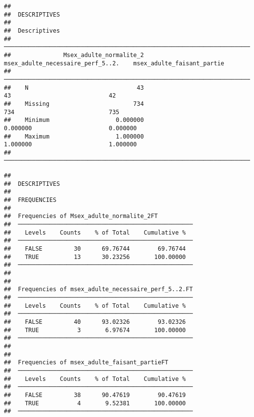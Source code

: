 \documentclass[
]{article}
\begin{document}
\begin{verbatim}
## 
##  DESCRIPTIVES
## 
##  Descriptives                                                                                              
##  ───────────────────────────────────────────────────────────────────────────────────────────────────────── 
##               Msex_adulte_normalite_2    msex_adulte_necessaire_perf_5..2.    msex_adulte_faisant_partie   
##  ───────────────────────────────────────────────────────────────────────────────────────────────────────── 
##    N                               43                                   43                            42   
##    Missing                        734                                  734                           735   
##    Minimum                   0.000000                             0.000000                      0.000000   
##    Maximum                   1.000000                             1.000000                      1.000000   
##  ─────────────────────────────────────────────────────────────────────────────────────────────────────────
\end{verbatim}

\begin{verbatim}
## 
##  DESCRIPTIVES
## 
##  FREQUENCIES
## 
##  Frequencies of Msex_adulte_normalite_2FT           
##  ────────────────────────────────────────────────── 
##    Levels    Counts    % of Total    Cumulative %   
##  ────────────────────────────────────────────────── 
##    FALSE         30      69.76744        69.76744   
##    TRUE          13      30.23256       100.00000   
##  ────────────────────────────────────────────────── 
## 
## 
##  Frequencies of msex_adulte_necessaire_perf_5..2.FT 
##  ────────────────────────────────────────────────── 
##    Levels    Counts    % of Total    Cumulative %   
##  ────────────────────────────────────────────────── 
##    FALSE         40      93.02326        93.02326   
##    TRUE           3       6.97674       100.00000   
##  ────────────────────────────────────────────────── 
## 
## 
##  Frequencies of msex_adulte_faisant_partieFT        
##  ────────────────────────────────────────────────── 
##    Levels    Counts    % of Total    Cumulative %   
##  ────────────────────────────────────────────────── 
##    FALSE         38      90.47619        90.47619   
##    TRUE           4       9.52381       100.00000   
##  ──────────────────────────────────────────────────
\end{verbatim}
\end{document}
